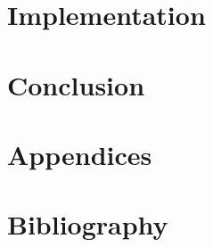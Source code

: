 \documentclass[11pt]{article}
\begin{document}
    \newpage

    \section{Implementation}\label{sec:implementation}

    \newpage

    \section{Conclusion}\label{sec:conclusion}

    \newpage

    \section{Appendices}\label{sec:appendices}

    \newpage

    \section{Bibliography}\label{sec:bibliography}

    
    
\end{document}
